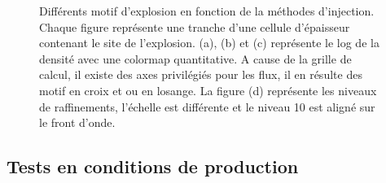 \begin{figure}

    \caption[Test de Sedov - Tranches]{Différents motif d'explosion en fonction de la méthodes d'injection.
    Chaque figure représente une tranche d'une cellule d'épaisseur contenant le site de l'explosion.
    (a), (b) et (c) représente le log de la densité avec une colormap quantitative.
    A cause de la grille de calcul, il existe des axes privilégiés pour les flux, il en résulte des motif en croix et ou en losange.
    La figure (d) représente les niveaux de raffinements, l'échelle est différente et le niveau 10 est aligné sur le front d'onde.
    }
 	\label{fig:sedovslice}
\end{figure}

%

\subsection{Tests en conditions de production}

